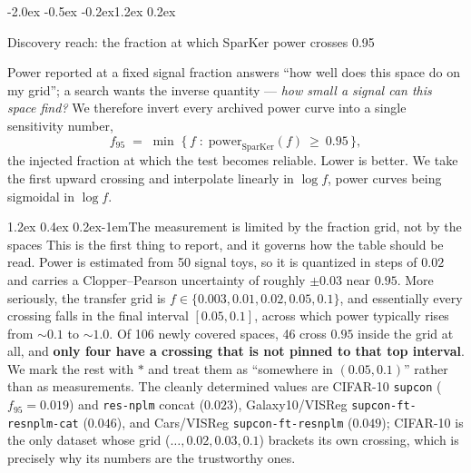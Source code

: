 \documentclass{article}
\makeatletter
\renewcommand\section{\@startsection{section}{1}{\z@}%
  {-2.0ex \@plus -0.5ex \@minus -0.2ex}{1.2ex \@plus 0.2ex}%
  {\large\bf\raggedright}}
\renewcommand\paragraph{\@startsection{paragraph}{4}{\z@}%
  {1.2ex \@plus 0.4ex \@minus 0.2ex}{-1em}{\normalsize\bf}}
\makeatother
\begin{document}
\section{Discovery reach: the fraction at which SparKer power crosses 0.95}
\label{app:reach}

Power reported at a fixed signal fraction answers ``how well does this space do
on my grid''; a search wants the inverse quantity --- \emph{how small a signal
can this space find?} We therefore invert every archived power curve into a
single sensitivity number,
\begin{equation}
f_{95} \;=\; \min\;\{\, f \;:\; \mathrm{power}_{\mathrm{SparKer}}(f)\ \ge\ 0.95 \,\},
\end{equation}
the injected fraction at which the test becomes reliable. Lower is better. We
take the first upward crossing and interpolate linearly in $\log f$, power
curves being sigmoidal in $\log f$.

\paragraph{The measurement is limited by the fraction grid, not by the spaces}
This is the first thing to report, and it governs how the table should be read.
Power is estimated from 50 signal toys, so it is quantized in steps of $0.02$
and carries a Clopper--Pearson uncertainty of roughly $\pm0.03$ near $0.95$.
More seriously, the transfer grid is
$f\in\{0.003,0.01,0.02,0.05,0.1\}$, and essentially every crossing falls in the
final interval $[0.05,0.1]$, across which power typically rises from $\sim0.1$
to $\sim1.0$. Of 106 newly covered spaces, 46 cross $0.95$ inside the grid at
all, and \textbf{only four have a crossing that is not pinned to that top
interval}. We mark the rest with $*$ and treat them as ``somewhere in
$(0.05,0.1)$'' rather than as measurements. The cleanly determined values are
CIFAR-10 \texttt{supcon} ($f_{95}=0.019$) and \texttt{res-nplm} concat
($0.023$), Galaxy10/VISReg \texttt{supcon-ft-resnplm-cat} ($0.046$), and
Cars/VISReg \texttt{supcon-ft-resnplm} ($0.049$); CIFAR-10 is the only dataset
whose grid ($\ldots,0.02,0.03,0.1$) brackets its own crossing, which is
precisely why its numbers are the trustworthy ones.
\end{document}
